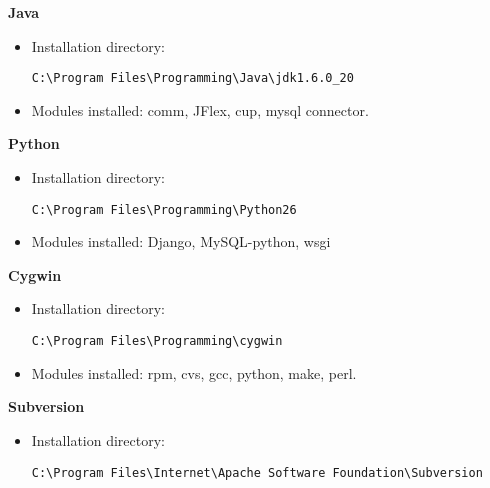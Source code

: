 \textbf{Java}
\begin{itemize}
\item Installation directory: \begin{verbatim}C:\Program Files\Programming\Java\jdk1.6.0_20\end{verbatim}
\item Modules installed: comm, JFlex, cup, mysql connector.
\end{itemize}
\textbf{Python}
\begin{itemize}
\item Installation directory: \begin{verbatim}C:\Program Files\Programming\Python26\end{verbatim}
\item Modules installed: Django, MySQL-python, wsgi
\end{itemize}
\textbf{Cygwin}
\begin{itemize}
\item Installation directory: \begin{verbatim}C:\Program Files\Programming\cygwin\end{verbatim}
\item Modules installed: rpm, cvs, gcc, python, make, perl.
\end{itemize}
\textbf{Subversion}
\begin{itemize}
\item Installation directory: \begin{verbatim}C:\Program Files\Internet\Apache Software Foundation\Subversion\end{verbatim}
\end{itemize}